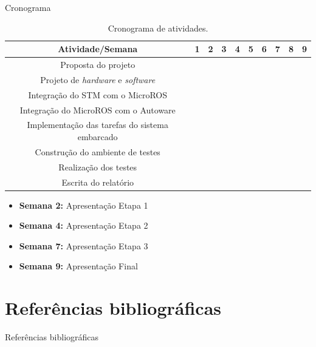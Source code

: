 \documentclass{if-beamer}
\begin{document}
\begin{frame}{Cronograma}
	
\begin{table}
	\centering
	\small{
		\begin{tabular}{|c|c|c|c|c|c|c|c|c|c|}
			\hline
			\textbf{Atividade/Semana} & 1 & \textbf{2} & 3 & \textbf{4} & 5 & 6 & \textbf{7} & 8 & \textbf{9} \\
			\hline
			Proposta do projeto  & \cellcolor{unifeiblue} &  &  &  &  &  &  &  &  \\
			\hline
			Projeto de \textit{hardware} e \textit{software}  &  & \cellcolor{unifeiblue} & \cellcolor{unifeiblue} &  &  &  &  &  &  \\
			\hline
			Integração do STM com o MicroROS  &  & \cellcolor{unifeiblue} &  &  &  &  &  &  &  \\
			\hline
			Integração do MicroROS com o Autoware  &  &  & \cellcolor{unifeiblue} & \cellcolor{unifeiblue} &  &  &  &  &  \\
			\hline
			Implementação das tarefas do sistema embarcado  &  &  &  & \cellcolor{unifeiblue} & \cellcolor{unifeiblue} & \cellcolor{unifeiblue} & \cellcolor{unifeiblue} &  &  \\
			\hline
			Construção do ambiente de testes  &  &  &  &  & \cellcolor{unifeiblue} & \cellcolor{unifeiblue} & \cellcolor{unifeiblue} &  &  \\
			\hline
			Realização dos testes  &  &  &  &  &  &  & \cellcolor{unifeiblue} & \cellcolor{unifeiblue} & \cellcolor{unifeiblue} \\
			\hline
			Escrita do relatório  &   & \cellcolor{unifeiblue} & \cellcolor{unifeiblue} & \cellcolor{unifeiblue} & \cellcolor{unifeiblue} & \cellcolor{unifeiblue} & \cellcolor{unifeiblue} & \cellcolor{unifeiblue} & \cellcolor{unifeiblue} \\
			\hline
		\end{tabular}
	}
	\caption{Cronograma de atividades.}
	\label{tab:crono}
\end{table}
	
	\begin{itemize}
		\small
		\item \textbf{Semana 2:} Apresentação Etapa 1
		\item \textbf{Semana 4:} Apresentação Etapa 2
		\item \textbf{Semana 7:} Apresentação Etapa 3
		\item \textbf{Semana 9:} Apresentação Final
	\end{itemize}
	
\end{frame}


\section{Referências bibliográficas}
\begin{frame}{Referências bibliográficas}
   
\end{frame}
\end{document}
